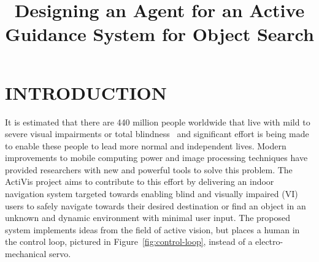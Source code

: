 \documentclass[a4paper, twoside]{article}
\begin{document}
\title{Designing an Agent for an Active Guidance System for Object Search} 

\author{
}



\onecolumn \maketitle \normalsize \vfill

\section{\uppercase{Introduction}}

\noindent It is estimated that there are 440 million people worldwide that live with mild to severe visual impairments or total blindness~\cite{bourne2017magnitude} and significant effort is being made to enable these people to lead more normal and independent lives. Modern improvements to mobile computing power and image processing techniques have provided researchers with new and powerful tools to solve this problem. The ActiVis project aims to contribute to this effort by delivering an indoor navigation system targeted towards enabling blind and visually impaired (VI) users to safely navigate towards their desired destination or find an object in an unknown and dynamic environment with minimal user input. The proposed system implements ideas from the field of active vision, but places a human in the control loop, pictured in Figure~\ref{fig:control-loop}, instead of a electro-mechanical servo. %
\end{document}
